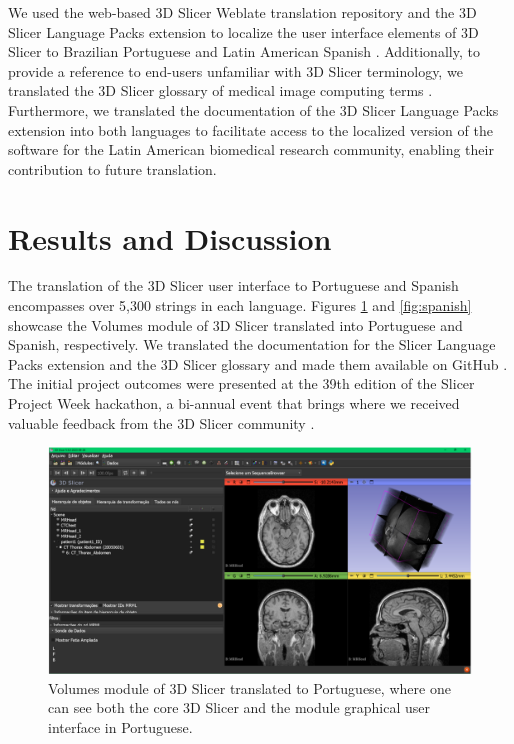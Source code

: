 \documentclass[nouppercase]{ifmbe}
\begin{document}
We used the web-based 3D Slicer Weblate translation repository and the 3D Slicer Language Packs extension to localize the user interface elements of 3D Slicer to Brazilian Portuguese and Latin American Spanish \cite{LANGUAGEPACK, WEBLATE}. Additionally, to provide a reference to end-users unfamiliar with 3D Slicer terminology, we translated the 3D Slicer glossary of medical image computing terms \cite{GLOSSARY}. Furthermore, we translated the documentation of the 3D Slicer Language Packs extension into both languages to facilitate access to the localized version of the software for the Latin American biomedical research community, enabling their contribution to future translation.

\section{Results and Discussion}

The translation of the 3D Slicer user interface to Portuguese and Spanish encompasses over 5,300 strings in each language. Figures \ref{fig:portuguese} and \ref{fig:spanish} showcase the Volumes module of 3D Slicer translated into Portuguese and Spanish, respectively. We translated the documentation for the Slicer Language Packs extension and the 3D Slicer glossary and made them available on GitHub \cite{PORTUGUESE-GLOSSARY, SPANISH-GLOSSARY}. The initial project outcomes were presented at the 39th edition of the Slicer Project Week hackathon, a bi-annual event that brings where we received valuable feedback from the 3D Slicer community \cite{SLICER-FOR-LA-PW39}.

\begin{figure}[ht]
      \centering
          \includegraphics[width=1\columnwidth]{figures/3DSlicer_Portuguese.png}
      \caption{Volumes module of 3D Slicer translated to Portuguese, where one can see both the core 3D Slicer and the module graphical user interface in Portuguese.}
      \label{fig:portuguese}
\end{figure}
\end{document}
